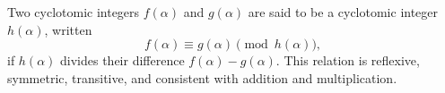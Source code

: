 Two cyclotomic integers $f(\alpha)$ and $g(\alpha)$ are said to be  a cyclotomic integer $h(\alpha)$, written
$$f(\alpha) \equiv g(\alpha) \pmod{h(\alpha)},$$
if $h(\alpha)$ divides their difference $f(\alpha) - g(\alpha)$. This relation is reflexive, symmetric, transitive, and consistent with addition and multiplication.
